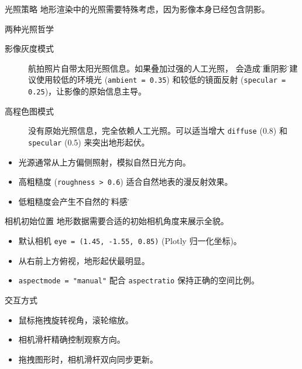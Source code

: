 \documentclass[aspectratio=169,11pt]{ctexbeamer}
\begin{document}
\begin{frame}{光照策略}
  地形渲染中的光照需要特殊考虑，因为影像本身已经包含阴影。

  \begin{block}{两种光照哲学}
    \begin{description}
      \item[影像灰度模式] 航拍照片自带太阳光照信息。如果叠加过强的人工光照，
        会造成\"双重阴影\"。建议使用较低的环境光 (\texttt{ambient = 0.35})
        和较低的镜面反射 (\texttt{specular = 0.25})，让影像的原始信息主导。
      \item[高程色图模式] 没有原始光照信息，完全依赖人工光照。可以适当增大
        \texttt{diffuse} (0.8) 和 \texttt{specular} (0.5) 来突出地形起伏。
    \end{description}
  \end{block}

  \begin{itemize}
    \item 光源通常从上方偏侧照射，模拟自然日光方向。
    \item 高粗糙度 (\texttt{roughness > 0.6}) 适合自然地表的漫反射效果。
    \item 低粗糙度会产生不自然的\"塑料感\"。
  \end{itemize}
\end{frame}

\begin{frame}{相机初始位置}
  地形数据需要合适的初始相机角度来展示全貌。

  \begin{itemize}
    \item 默认相机 \texttt{eye = (1.45, -1.55, 0.85)} (Plotly 归一化坐标)。
    \item 从右前上方俯视，地形起伏最明显。
    \item \texttt{aspectmode = "manual"} 配合 \texttt{aspectratio} 保持正确的空间比例。
  \end{itemize}

  \begin{block}{交互方式}
    \begin{itemize}
      \item 鼠标拖拽旋转视角，滚轮缩放。
      \item 相机滑杆精确控制观察方向。
      \item 拖拽图形时，相机滑杆双向同步更新。
    \end{itemize}
  \end{block}
\end{frame}
\end{document}
